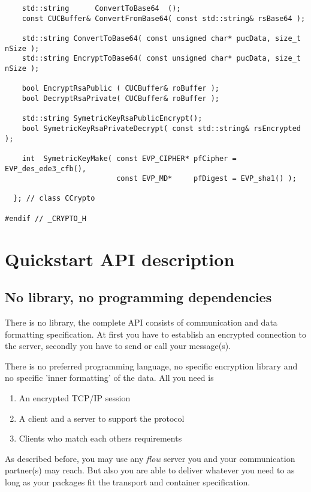 \documentclass[twoside,a4paper,english,12pt,authoryear,openright]{book}
\newcommand{\flow}{\textit{flow} }
\begin{document}
\begin{lstlisting}
    std::string      ConvertToBase64  ();
    const CUCBuffer& ConvertFromBase64( const std::string& rsBase64 );

    std::string ConvertToBase64( const unsigned char* pucData, size_t nSize );
    std::string EncryptToBase64( const unsigned char* pucData, size_t nSize );

    bool EncryptRsaPublic ( CUCBuffer& roBuffer );
    bool DecryptRsaPrivate( CUCBuffer& roBuffer );

    std::string SymetricKeyRsaPublicEncrypt();
    bool SymetricKeyRsaPrivateDecrypt( const std::string& rsEncrypted );

    int  SymetricKeyMake( const EVP_CIPHER* pfCipher = EVP_des_ede3_cfb(),
                          const EVP_MD*     pfDigest = EVP_sha1() );

  }; // class CCrypto

#endif // _CRYPTO_H
\end{lstlisting}



\chapter{Quickstart API description}

\section{No library, no programming dependencies}

There is no library, the complete API consists of communication and data formatting specification. At first you have to establish an encrypted connection to the server, secondly you have to send or call your message(s).

There is no preferred programming language, no specific encryption library and no specific 'inner formatting' of the data. All you need is

\begin{enumerate}
\item{An encrypted TCP/IP session}
\item{A client and a server to support the protocol}
\item{Clients who match each others requirements}
\end{enumerate}

As described before, you may use any \flow server you and your communication partner(s) may reach. But also you are able to deliver whatever you need to as long as your packages fit the transport and container specification.
\end{document}
